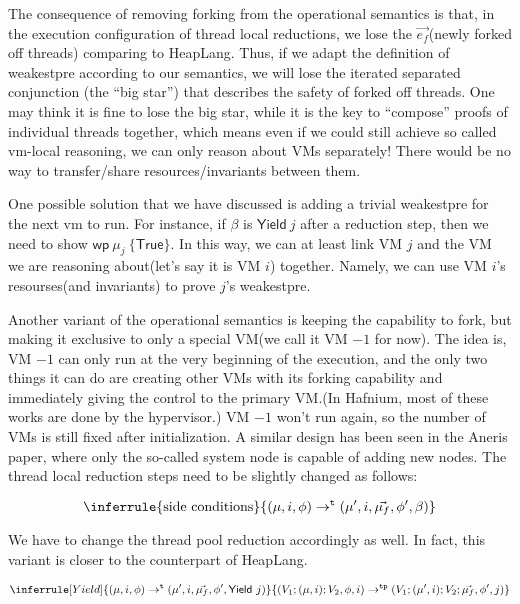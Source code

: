 \documentclass[a4paper]{article}
\begin{document}
The consequence of removing forking from the operational semantics is
that, in the execution configuration of thread local reductions, we lose the
$\vec{e_{f}}$(newly forked off threads) comparing to HeapLang. Thus, if we adapt
the definition of weakestpre according to our semantics, we will lose the
iterated separated conjunction (the ``big star'') that describes the safety of
forked off threads. One may think it is fine to lose the big star, while it is
the key to ``compose'' proofs of individual threads together, which means even if we could
still achieve so called vm-local reasoning, we can only reason about VMs
separately! There would be no way to transfer/share resources/invariants between
them.

One possible solution that we have discussed is adding a
trivial weakestpre for the next vm to run. For instance, if $\beta$ is
$\mathsf{Yield}~j$ after a reduction step, then we need to show
$\mathsf{wp}~ \mu_{j}~ \{\mathsf{True}\}$. In this way, we can at least link VM
$j$ and the VM we are reasoning about(let's say it is VM $i$) together. Namely,
we can use VM $i$'s resourses(and invariants) to prove $j$'s weakestpre.

Another variant of the operational semantics is keeping the capability to fork, but making it exclusive to only a special VM(we call it VM $-1$ for now). The idea is, VM $-1$ can only run at the very beginning of the execution, and the only two things it can do are creating other VMs with its forking capability and immediately giving the control to the primary VM.(In Hafnium, most of these works are done by the hypervisor.) VM $-1$ won't run again, so the number of VMs is still fixed after initialization. A similar design has been seen in the Aneris paper, where only the so-called system node is capable of adding new nodes. The thread local reduction steps need to be slightly changed as follows:

\begin{displaymath}
  \inferrule{
    \text{side conditions}
  }{
    (\mu,i, \phi) \tlr (\mu',i, \vec{\mu_{f}}, \phi', \beta)
  }
\end{displaymath}


We have to change the thread pool reduction accordingly as well. In fact, this variant is closer to the counterpart of HeapLang.

\begin{displaymath}
  \inferrule[Yield]{
     (\mu,i, \phi) \tlr (\mu',i,\vec{\mu_{f}} ,\phi', \mathsf{Yield}~j)
  }{
    (V_{1};(\mu,i);V_{2}, \phi, i) \tpr (V_{1};(\mu',i);V_{2};\vec{\mu_{f}}, \phi', j)
  }
\end{displaymath}
\end{document}
